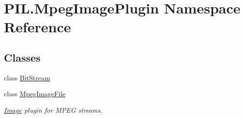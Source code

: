 \hypertarget{namespacePIL_1_1MpegImagePlugin}{}\section{P\+I\+L.\+Mpeg\+Image\+Plugin Namespace Reference}
\label{namespacePIL_1_1MpegImagePlugin}
\subsection*{Classes}
\begin{DoxyCompactItemize}
\item 
class \hyperlink{classPIL_1_1MpegImagePlugin_1_1BitStream}{Bit\+Stream}
\item 
class \hyperlink{classPIL_1_1MpegImagePlugin_1_1MpegImageFile}{Mpeg\+Image\+File}
\begin{DoxyCompactList}\small\item\em \hyperlink{namespacePIL_1_1Image}{Image} plugin for M\+P\+EG streams. \end{DoxyCompactList}\end{DoxyCompactItemize}
